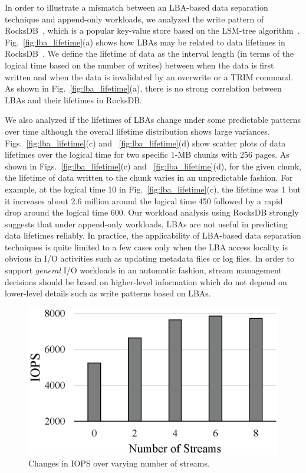 In order to illustrate a mismatch between an LBA-based data separation technique and 
append-only workloads, we analyzed the write pattern of 
RocksDB~\cite{RocksDB}, which is a
popular key-value store based on the LSM-tree algorithm~\cite{LSM}.
Fig.~\ref{fig:lba_lifetime}(a) shows how LBAs may be related 
to data lifetimes in RocksDB~\cite{RocksDB}.  
We define the lifetime of data as the interval length (in terms of
the logical time based on the number of writes) between
when the data is first written and when the data is invalidated
by an overwrite or a TRIM command.
As shown in Fig.~\ref{fig:lba_lifetime}(a), 
there is no strong correlation between LBAs and their lifetimes in RocksDB.  


We also analyzed 
if the lifetimes of LBAs change under some predictable patterns over time 
although the overall lifetime distribution shows large variances.
Figs.~\ref{fig:lba_lifetime}(c) and ~\ref{fig:lba_lifetime}(d) show
scatter plots of data lifetimes over the logical time 
for two specific 1-MB chunks with 256 pages. 
As shown in Figs.~\ref{fig:lba_lifetime}(c) and ~\ref{fig:lba_lifetime}(d), 
for the given chunk, the lifetime of data written to the chunk 
varies in an unpredictable fashion.  
For example, at the logical time 10 in Fig.~\ref{fig:lba_lifetime}(c), 
the lifetime was 1 but it increases about 
2.6 million around the logical time 450 
followed by a rapid drop around the logical time 600. 
Our workload analysis using RocksDB strongly suggests that under append-only workloads, 
LBAs are not useful in predicting data lifetimes reliably.
{\color{blue}
In practice, the applicability of LBA-based data separation techniques is quite 
limited to a few cases only when the LBA access
locality is obvious in I/O activities such as updating metadata files or log files.  
}
In order to support {\it general} I/O workloads in an automatic fashion, stream 
management decisions should be based on higher-level information
which do not depend on lower-level details such as write patterns based on LBAs.

\begin{figure}[t]
	\centering
	\includegraphics[width=0.7\linewidth]{figure/stream_perf}
	\caption{Changes in IOPS over varying number of streams.} 
	\label{fig:stream_perf}
\end{figure}


